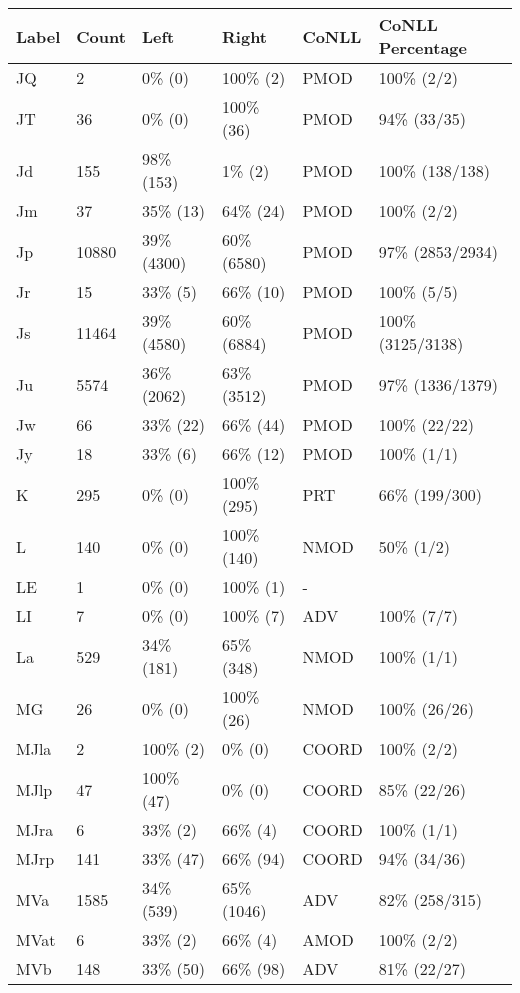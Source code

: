 \begin{figure*}
\begin{tabular}{|l|l|l|l||l|l|}
\hline
Label & Count & Left & Right & CoNLL & CoNLL Percentage\\ 
\hline
 JQ & 2 & 0\% (0) & 100\% (2) & PMOD & 100\% (2/2) \\ 
\hline
 JT & 36 & 0\% (0) & 100\% (36) & PMOD & 94\% (33/35) \\ 
\hline
 Jd & 155 & 98\% (153) & 1\% (2) & PMOD & 100\% (138/138) \\ 
\hline
 Jm & 37 & 35\% (13) & 64\% (24) & PMOD & 100\% (2/2) \\ 
\hline
 Jp & 10880 & 39\% (4300) & 60\% (6580) & PMOD & 97\% (2853/2934) \\ 
\hline
 Jr & 15 & 33\% (5) & 66\% (10) & PMOD & 100\% (5/5) \\ 
\hline
 Js & 11464 & 39\% (4580) & 60\% (6884) & PMOD & 100\% (3125/3138) \\ 
\hline
 Ju & 5574 & 36\% (2062) & 63\% (3512) & PMOD & 97\% (1336/1379) \\ 
\hline
 Jw & 66 & 33\% (22) & 66\% (44) & PMOD & 100\% (22/22) \\ 
\hline
 Jy & 18 & 33\% (6) & 66\% (12) & PMOD & 100\% (1/1) \\ 
\hline
 K & 295 & 0\% (0) & 100\% (295) & PRT & 66\% (199/300) \\ 
\hline
 L & 140 & 0\% (0) & 100\% (140) & NMOD & 50\% (1/2) \\ 
\hline
 LE & 1 & 0\% (0) & 100\% (1) & - &  \\ 
\hline
 LI & 7 & 0\% (0) & 100\% (7) & ADV & 100\% (7/7) \\ 
\hline
 La & 529 & 34\% (181) & 65\% (348) & NMOD & 100\% (1/1) \\ 
\hline
 MG & 26 & 0\% (0) & 100\% (26) & NMOD & 100\% (26/26) \\ 
\hline
 MJla & 2 & 100\% (2) & 0\% (0) & COORD & 100\% (2/2) \\ 
\hline
 MJlp & 47 & 100\% (47) & 0\% (0) & COORD & 85\% (22/26) \\ 
\hline
 MJra & 6 & 33\% (2) & 66\% (4) & COORD & 100\% (1/1) \\ 
\hline
 MJrp & 141 & 33\% (47) & 66\% (94) & COORD & 94\% (34/36) \\ 
\hline
 MVa & 1585 & 34\% (539) & 65\% (1046) & ADV & 82\% (258/315) \\ 
\hline
 MVat & 6 & 33\% (2) & 66\% (4) & AMOD & 100\% (2/2) \\ 
\hline
 MVb & 148 & 33\% (50) & 66\% (98) & ADV & 81\% (22/27) \\ 

\end{tabular}
\end{figure*}
